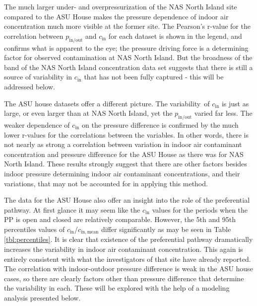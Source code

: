\documentclass[preprint,12pt]{elsarticle}
\begin{document}
The much larger under- and overpressurization of the NAS North Island site compared to the ASU House makes the pressure dependence of indoor air concentration much more visible at the former site.
The Pearson’s r-value for the correlation between $p_\mathrm{in/out}$ and $c_\mathrm{in}$ for each dataset is shown in the legend, and confirms what is apparent to the eye; the pressure driving force is a determining factor for observed contamination at NAS North Island.
But the broadness of the band of the NAS North Island concentration data set suggests that there is still a source of variability in $c_\mathrm{in}$ that has not been fully captured - this will be addressed below.\par

The ASU house datasets offer a different picture.
The variability of $c_\mathrm{in}$ is just as large, or even larger than at NAS North Island, yet the $p_\mathrm{in/out}$ varied far less.
The weaker dependence of $c_\mathrm{in}$ on the pressure difference is confirmed by the much lower r-values for the correlations between the variables.
In other words, there is not nearly as strong a correlation between variation in indoor air contaminant concentration and pressure difference for the ASU House as there was for NAS North Island.
These results strongly suggest that there are other factors besides indoor pressure determining indoor air contaminant concentrations, and their variations, that may not be accounted for in applying this method.\par

The data for the ASU House also offer an insight into the role of the preferential pathway.
At first glance it may seem like the $c_\mathrm{in}$ values for the periods when the PP is open and closed are relatively comparable.
However, the 5th and 95th percentiles values of $c_\mathrm{in}$/$c_\mathrm{in,mean}$ differ significantly as may be seen in Table \ref{tbl:percentiles}.
It is clear that existence of the preferential pathway dramatically increases the variability in indoor air contaminant concentration.
This again is entirely consistent with what the investigators of that site have already reported\cite{guo_identification_2015}.
The correlation with indoor-outdoor pressure difference is weak in the ASU house cases, so there are clearly factors other than pressure difference that determine the variability in each.
These will be explored with the help of a modeling analysis presented below.\par
\end{document}
